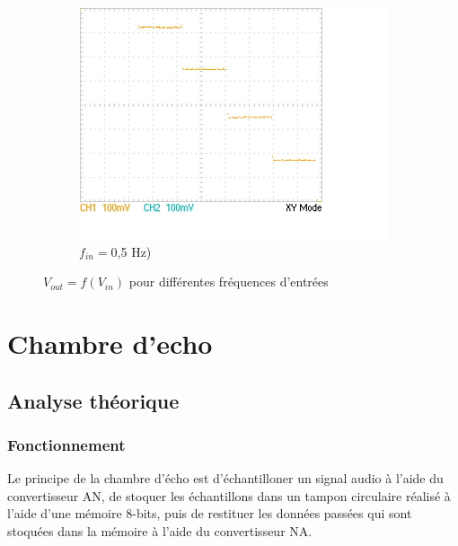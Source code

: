 \documentclass{article}
\begin{document}
\begin{figure}[h!]
\begin{subfigure}[b]{0.3\textwidth}
    \centering
    \includegraphics[width=\textwidth]{data/TEK0020_}
    \caption{$f_{in}=$0,5 Hz)}
    \label{fig:fastXY}
  \end{subfigure}
  \hfill  \caption{$V_{out}=f(V_{in})$ pour différentes fréquences d'entrées}
  \label{fig:slow}
\end{figure}




\chapter{Chambre d'echo}
\section{Analyse théorique}

\subsection{Fonctionnement}
Le principe de la chambre d'écho est d'échantilloner un signal audio à l'aide du convertisseur AN, de stoquer les échantillons dans un tampon circulaire réalisé à l'aide d'une mémoire 8-bits, puis de restituer les données passées qui sont stoquées dans la mémoire à l'aide du convertisseur NA.
\end{document}
